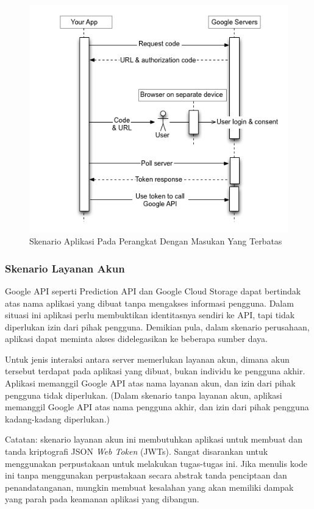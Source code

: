 \begin{figure}[H]
\centering
\includegraphics[scale=0.9]{Gambar/skenario3.png}
\caption[Skenario Aplikasi Pada Perangkat Dengan Masukan Yang
Terbatas]{Skenario Aplikasi Pada Perangkat Dengan Masukan Yang Terbatas}
\label{fig:skenarioaplikasimasukanterbatas}
\end{figure}

\subsubsection{Skenario Layanan Akun}
Google API seperti Prediction API dan Google Cloud Storage dapat bertindak atas
nama aplikasi yang dibuat tanpa mengakses informasi pengguna. Dalam situasi ini
aplikasi perlu membuktikan identitasnya sendiri ke API, tapi tidak diperlukan
izin dari pihak pengguna. Demikian pula, dalam skenario perusahaan, aplikasi
dapat meminta akses didelegasikan ke beberapa sumber daya.

Untuk jenis interaksi antara server memerlukan layanan akun, dimana akun
tersebut terdapat pada aplikasi yang dibuat, bukan individu ke pengguna akhir.
Aplikasi memanggil Google API atas nama layanan akun, dan izin dari pihak
pengguna tidak diperlukan. (Dalam skenario tanpa layanan akun, aplikasi
memanggil Google API atas nama pengguna akhir, dan izin dari pihak pengguna
kadang-kadang diperlukan.)

Catatan: skenario layanan akun ini membutuhkan aplikasi untuk membuat dan tanda
kriptografi JSON {\it Web Token} (JWTs). Sangat disarankan untuk menggunakan
perpustakaan untuk melakukan tugas-tugas ini. Jika menulis kode ini tanpa
menggunakan perpustakaan secara abstrak tanda penciptaan dan penandatanganan,
mungkin membuat kesalahan yang akan memiliki dampak yang parah pada keamanan
aplikasi yang dibangun.

